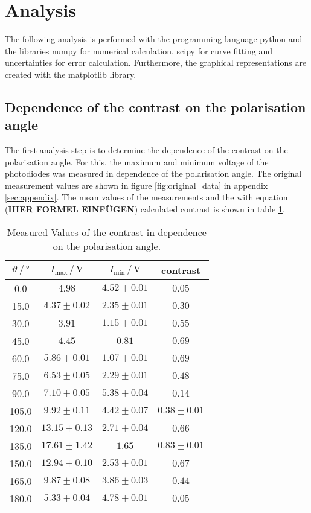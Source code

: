 \section{Analysis}
\label{sec:Analysis}

The following analysis is performed with the programming language python \cite{python} and the libraries numpy \cite{numpy} for numerical calculation, scipy \cite{scipy} for curve fitting and uncertainties \cite{uncertainties} for error calculation.
Furthermore, the graphical representations are created with the matplotlib \cite{matplotlib} library.

\subsection{Dependence of the contrast on the polarisation angle}
\label{subsec:polarisation}

The first analysis step is to determine the dependence of the contrast on the polarisation angle.
For this, the maximum and minimum voltage of the photodiodes was measured in dependence of the polarisation angle.
The original measurement values are shown in figure \ref{fig:original_data} in appendix \ref{sec:appendix}.
The mean values of the measurements and the with equation (\textbf{HIER FORMEL EINFÜGEN}) calculated contrast is shown in table \ref{tab:values_polarisation}.

\begin{table}[H]
    \centering
    \caption{Measured Values of the contrast in dependence on the polarisation angle.}
    \label{tab:values_polarisation}
    \begin{tabular}{c c c c}
        \toprule
        $\vartheta \,/\, \si{\degree}$ & $I_{\text{max}}\,/\,\si{\volt}$ & $I_{\text{min}}\,/\,\si{\volt}$ & contrast \\
        \midrule
        0.0 & $4.98$ & $4.52\pm0.01$ & $0.05$ \\
        15.0 & $4.37\pm0.02$ & $2.35\pm0.01$ & $0.30$ \\
        30.0 & $3.91$ & $1.15\pm0.01$ & $0.55$ \\
        45.0 & $4.45$ & $0.81$ & $0.69$ \\
        60.0 & $5.86\pm0.01$ & $1.07\pm0.01$ & $0.69$ \\
        75.0 & $6.53\pm0.05$ & $2.29\pm0.01$ & $0.48$ \\
        90.0 & $7.10\pm0.05$ & $5.38\pm0.04$ & $0.14$ \\
        105.0 & $9.92\pm0.11$ & $4.42\pm0.07$ & $0.38\pm0.01$ \\
        120.0 & $13.15\pm0.13$ & $2.71\pm0.04$ & $0.66$ \\
        135.0 & $17.61\pm1.42$ & $1.65$ & $0.83\pm0.01$ \\
        150.0 & $12.94\pm0.10$ & $2.53\pm0.01$ & $0.67$ \\
        165.0 & $9.87\pm0.08$ & $3.86\pm0.03$ & $0.44$ \\
        180.0 & $5.33\pm0.04$ & $4.78\pm0.01$ & $0.05$ \\
        \bottomrule
    \end{tabular}
\end{table}

